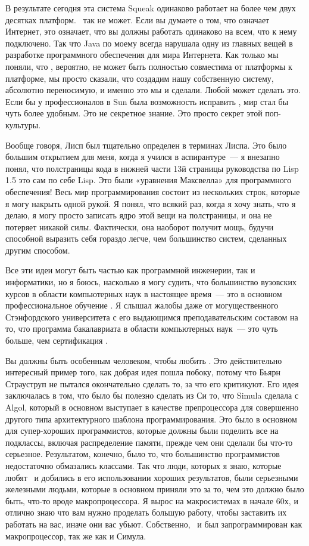 В результате сегодня эта система Squeak одинаково работает на более чем двух десятках платформ.
\java\ так не может. Если вы думаете о том, что означает Интернет, это означает, 
что вы должны работать одинаково на всем, что к нему подключено.
Так что Java по моему всегда нарушала одну из главных вещей в разработке 
программного обеспечения для мира Интернета.
Как только мы поняли, что \java, вероятно, не может быть полностью совместима от 
платформы к платформе, мы просто сказали, что создадим нашу собственную систему, 
абсолютно переносимую, и именно это мы и сделали.
Любой может сделать это. Если бы у профессионалов в Sun была возможность исправить \java,
мир стал бы чуть более удобным. Это не секретное знание. Это просто секрет этой поп-культуры.

Вообще говоря, Лисп был тщательно определен в терминах Лиспа.
Это было большим открытием для меня, когда я учился в аспирантуре\ --- я внезапно понял, 
что полстраницы кода в нижней части 13й страницы руководства по Lisp 1.5 это сам по себе Lisp.
Это были «уравнения Максвелла» для программного обеспечения! Весь мир программирования 
состоит из нескольких строк, которые я могу накрыть одной рукой.
Я понял, что всякий раз, когда я хочу знать, что я делаю, я могу просто записать 
ядро этой вещи на полстраницы, и она не потеряет никакой силы.
Фактически, она наоборот получит мощь, будучи способной выразить себя гораздо легче, 
чем большинство систем, сделанных другим способом.

Все эти идеи могут быть частью как программной инженерии, так и информатики, но я боюсь, 
насколько я могу судить, что большинство вузовских курсов в области компьютерных наук 
в настоящее время\ --- это в основном профессиональное обучение \java.
Я слышал жалобы даже от могущественного Стэнфордского университета с его выдающимся 
преподавательским составом на то, что программа бакалавриата в области компьютерных 
наук\ --- это чуть больше, чем сертификация \java.

Вы должны быть особенным человеком, чтобы любить \cpp. 
Это действительно интересный пример того, как добрая идея пошла побоку, потому что 
Бьярн Страуструп не пытался окончательно сделать то, за что его критикуют.
Его идея заключалась в том, что было бы полезно сделать из Си то, что Simula 
сделала с Algol, который в основном выступает в качестве препроцессора для 
совершенно другого типа архитектурного шаблона программирования.
Это было в основном для супер-хороших программистов, которые должны были поделить 
все на подклассы, включая распределение памяти, прежде чем они сделали бы что-то серьезное.
Результатом, конечно, было то, что большинство программистов недостаточно обмазались классами.
Так что люди, которых я знаю, которые любят \cpp\ и добились в его использовании
хороших результатов, были серьезными железными людьми, которые в основном приняли 
это за то, чем это должно было быть, что-то вроде макропроцессора.
Я вырос на макросистемах в начале 60х, и отлично знаю что вам нужно проделать большую 
работу, чтобы заставить их работать на вас, иначе они вас убьют.
Собственно, \cpp\ и был запрограммирован как макропроцессор, так же как и Симула.

